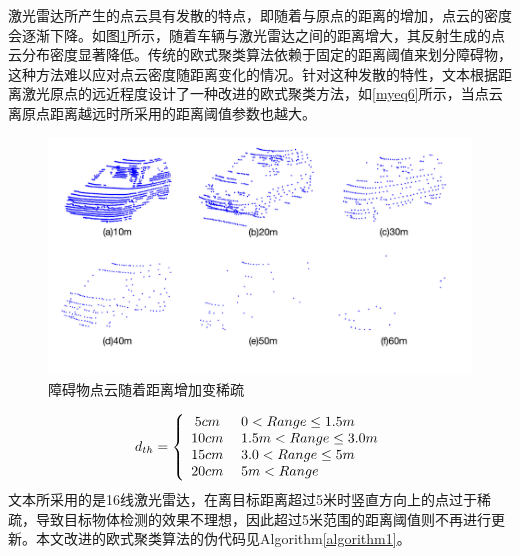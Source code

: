 激光雷达所产生的点云具有发散的特点，即随着与原点的距离的增加，点云的密度会逐渐下降。如图\ref{fcarpoints}所示，随着车辆与激光雷达之间的距离增大，其反射生成的点云分布密度显著降低。传统的欧式聚类算法依赖于固定的距离阈值来划分障碍物，这种方法难以应对点云密度随距离变化的情况。针对这种发散的特性，文本根据距离激光原点的远近程度设计了一种改进的欧式聚类方法，如\eqref{myeq6}所示，当点云离原点距离越远时所采用的距离阈值参数也越大。
\begin{figure}[htbp]
    \centering
    \includegraphics[scale=0.75]{Fig/carpoints.png}
    \caption{\label{fcarpoints}障碍物点云随着距离增加变稀疏}
\end{figure}
\begin{equation}
    {d_{th}} = \left\{ {\begin{array}{*{20}{c}}
{5cm}\\
{10cm}\\
{15cm}\\
{20cm}
\end{array}} \right.{\rm{ }}\begin{array}{*{20}{l}}
{0 < Range \le 1.5m}\\
{1.5m < Range \le 3.0m}\\
{3.0 < Range \le 5m}\\
{5m < Range}
\end{array}
    \label{myeq6}
\end{equation}
文本所采用的是16线激光雷达，在离目标距离超过5米时竖直方向上的点过于稀疏，导致目标物体检测的效果不理想，因此超过5米范围的距离阈值则不再进行更新。本文改进的欧式聚类算法的伪代码见Algorithm\ref{algorithm1}。
